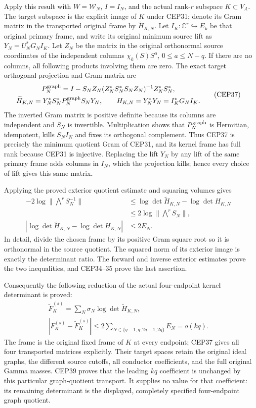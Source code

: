 \documentclass[11pt,a4paper]{article}
\begin{document}
Apply this result with $W=\mathcal W_N$, $I=I_N$, and the
actual rank-$r$ subspace $K\subset V_A$. The target subspace is
the explicit image of $K$ under CEP31; denote its Gram matrix
in the transported original frame by $\widetilde H_{K,N}$.
Let $I_K:\mathbb C^r\hookrightarrow E_k$ be that original
primary frame, and write its original minimum source lift as
$Y_N=U_N^*G_N I_K$.
Let $Z_N$ be the matrix in the original orthonormal source
coordinates of the independent columns
$\chi_k(S)S^a$, $0\le a\le N-q$. If there are no columns,
all following products involving them are zero.
The exact target orthogonal projection and Gram matrix are
\[
 \begin{gathered}
 P_N^{\rm graph}
  =I-S_NZ_N(Z_N^*S_N^*S_NZ_N)^{-1}Z_N^*S_N^*,\\
 \widetilde H_{K,N}
       =Y_N^*S_N^*P_N^{\rm graph}S_NY_N,\qquad
 H_{K,N}=Y_N^*Y_N=I_K^*G_NI_K .
 \end{gathered}\tag{CEP37}
\]
The inverted Gram matrix is positive definite because its
columns are independent and $S_N$ is invertible. Multiplication
shows that $P_N^{\rm graph}$ is Hermitian, idempotent, kills
$S_NI_N$ and fixes its orthogonal complement. Thus CEP37 is
precisely the minimum quotient Gram of CEP31, and its kernel
frame has full rank because CEP31 is injective.
Replacing the lift $Y_N$ by any lift of the same primary frame
adds columns in $I_N$, which the projection kills; hence every
choice of lift gives this same matrix.

Applying the proved exterior quotient estimate and squaring
volumes gives
\[
 \begin{split}
 -2\log\|\bigwedge^r S_N^{-1}\|
 &\le \log\det\widetilde H_{K,N}-\log\det H_{K,N}\\
 &\le2\log\|\bigwedge^r S_N\|,\\
 \left|\log\det\widetilde H_{K,N}-\log\det H_{K,N}\right|
 &\le2E_N .
 \end{split}\tag{CEP38}
\]
In detail, divide the chosen frame by its positive Gram square
root so it is orthonormal in the source quotient. The squared
norm of its exterior image is exactly the determinant ratio.
The forward and inverse exterior estimates prove the two
inequalities, and CEP34--35 prove the last assertion.

Consequently the following reduction of the actual four-endpoint
kernel determinant is proved:
\[
 \begin{gathered}
 \widetilde F_K^{(s)}
       =\sum_N\sigma_N\log\det\widetilde H_{K,N},\\
 |F_K^{(s)}-\widetilde F_K^{(s)}|
       \le2\sum_{N\in\{q-1,q,2q-1,2q\}}E_N=o(kq).
 \end{gathered}\tag{CEP39}
\]
The frame is the original fixed frame of $K$ at every endpoint;
CEP37 gives all four transported matrices explicitly.
Their target spaces retain the original ideal graphs, the
different source cutoffs, all conductor coefficients, and the
full original Gamma masses. CEP39 proves that the leading
$kq$ coefficient is unchanged by this particular graph-quotient
transport. It supplies no value for that coefficient: its
remaining determinant is the displayed, completely specified
four-endpoint graph quotient.
\end{document}
